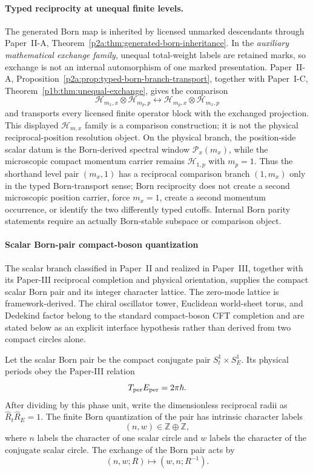 \documentclass[12pt,a4paper]{article}
\begin{document}
\paragraph{Typed reciprocity at unequal finite levels.}
The generated Born map is inherited by licensed unmarked descendants through
Paper~II-A, Theorem~\ref{p2a:thm:generated-born-inheritance}.  In the
\emph{auxiliary mathematical exchange family}, unequal total-weight labels are
retained marks, so exchange is not an internal automorphism of one marked
presentation.  Paper~II-A,
Proposition~\ref{p2a:prop:typed-born-branch-transport}, together with
Paper~I-C, Theorem~\ref{p1b:thm:unequal-exchange}, gives the comparison
\[
 \mathcal H_{m_x,x}\otimes\mathcal H_{m_p,p}
 \longleftrightarrow
 \mathcal H_{m_p,x}\otimes\mathcal H_{m_x,p}
\]
and transports every licensed finite operator block with the exchanged
projection.  This displayed \(\mathcal H_{m,x}\) family is a comparison
construction; it is not the physical reciprocal-position resolution object.
On the physical branch, the position-side scalar datum is the Born-derived
spectral window \(\mathcal P_x(m_x)\), while the microscopic compact momentum
carrier remains \(\mathcal H_{1,p}\) with \(m_p=1\).  Thus the shorthand
level pair \((m_x,1)\) has a reciprocal comparison branch \((1,m_x)\) only in
the typed Born-transport sense; Born reciprocity does not create a second
microscopic position carrier, force \(m_x=1\), create a second momentum
occurrence, or identify the two differently typed cutoffs.  Internal Born
parity statements require an actually Born-stable subspace or comparison
object.




\paragraph{Scalar Born-pair compact-boson quantization}
\label{p4:sec:scalar-born-pair-compact-boson}

The scalar branch classified in Paper~II and realized in Paper~III, together with its Paper-III reciprocal completion and physical orientation, supplies the compact scalar Born pair and its integer character lattice.  The zero-mode lattice is framework-derived.  The chiral oscillator tower, Euclidean world-sheet torus, and Dedekind factor belong to the standard compact-boson CFT completion and are stated below as an explicit interface hypothesis rather than derived from two compact circles alone.

\begin{lemma}
\label{p4:lem:scalar-born-character-lattice}
Let the scalar Born pair be the compact conjugate pair
\(S^1_t\times S^1_E\).  Its physical periods obey the Paper-III relation
\[
T_{\rm per}E_{\rm per}=2\pi\hbar.
\]
After dividing by this phase unit, write the dimensionless reciprocal radii
as \(\widehat R_t\widehat R_E=1\).  The finite Born quantization of the pair
has intrinsic character labels
\[
  (n,w)\in\mathbb Z\oplus\mathbb Z,
\]
where \(n\) labels the character of one scalar circle and \(w\) labels the character of the conjugate scalar circle.  The exchange of the Born pair acts by
\[
  (n,w;R)\longmapsto (w,n;R^{-1}).
\]
\end{lemma}
\end{document}
